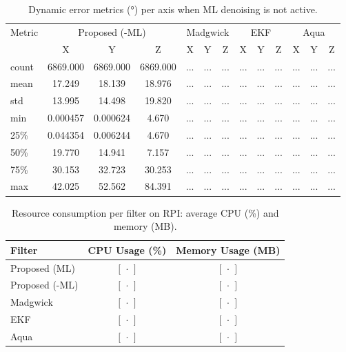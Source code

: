\documentclass{iutbscthesis}
\begin{document}
\begin{table}[ht]
\centering
\caption{Dynamic error metrics (°) per axis when ML denoising is not active.}
\label{tab:dynamic_no_ml}
\begin{tabular}{l
  *{4}{ccc}
}
\toprule
Metric & \multicolumn{3}{c}{Proposed (-ML)} & \multicolumn{3}{c}{Madgwick} & \multicolumn{3}{c}{EKF} & \multicolumn{3}{c}{Aqua} \\
 & X & Y & Z & X & Y & Z & X & Y & Z & X & Y & Z \\
\midrule
count & 6869.000 & 6869.000 & 6869.000 & ... & ... & ... & ... & ... & ... & ... & ... & ... \\
mean & 17.249 & 18.139 & 18.976 & ... & ... & ... & ... & ... & ... & ... & ... & ... \\
std & 13.995 & 14.498 & 19.820 & ... & ... & ... & ... & ... & ... & ... & ... & ... \\
min & 0.000457 & 0.000624 & 4.670 & ... & ... & ... & ... & ... & ... & ... & ... & ... \\
25\% & 0.044354 & 0.006244 & 4.670 & ... & ... & ... & ... & ... & ... & ... & ... & ... \\
50\% & 19.770 & 14.941 & 7.157 & ... & ... & ... & ... & ... & ... & ... & ... & ... \\
75\% & 30.153 & 32.723 & 30.253 & ... & ... & ... & ... & ... & ... & ... & ... & ... \\
max & 42.025 & 52.562 & 84.391 & ... & ... & ... & ... & ... & ... & ... & ... & ... \\
\bottomrule
\end{tabular}
\end{table}



\begin{table}[ht]
  \centering
  \caption{Resource consumption per filter on RPI: average CPU (\%) and memory (MB).}
  \label{tab:resource_consumption}
  \begin{tabular}{lcc}
    \toprule
    Filter & CPU Usage (\%) & Memory Usage (MB) \\
    \midrule
    Proposed (ML)     & \([\,\cdot\,]\) & \([\,\cdot\,]\) \\
    Proposed (-ML)    & \([\,\cdot\,]\) & \([\,\cdot\,]\) \\
    Madgwick           & \([\,\cdot\,]\) & \([\,\cdot\,]\) \\
    EKF                & \([\,\cdot\,]\) & \([\,\cdot\,]\) \\
    Aqua               & \([\,\cdot\,]\) & \([\,\cdot\,]\) \\
    \bottomrule
  \end{tabular}
\end{table}
\end{document}
